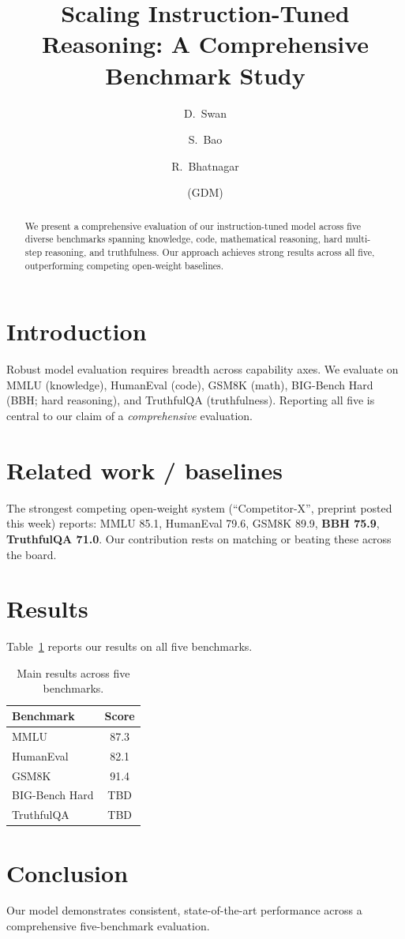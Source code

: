 \documentclass{article}
\title{Scaling Instruction-Tuned Reasoning: A Comprehensive Benchmark Study}
\author{D.\ Swan \and S.\ Bao \and R.\ Bhatnagar \and (GDM)}
\begin{document}
\maketitle

\begin{abstract}
We present a comprehensive evaluation of our instruction-tuned model
across five diverse benchmarks spanning knowledge, code, mathematical
reasoning, hard multi-step reasoning, and truthfulness. Our approach
achieves strong results across all five, outperforming competing
open-weight baselines. %
\end{abstract}

\section{Introduction}
Robust model evaluation requires breadth across capability axes. We
evaluate on MMLU (knowledge), HumanEval (code), GSM8K (math), BIG-Bench
Hard (BBH; hard reasoning), and TruthfulQA (truthfulness). Reporting all
five is central to our claim of a \emph{comprehensive} evaluation.

\section{Related work / baselines}
The strongest competing open-weight system (``Competitor-X'', preprint
posted this week) reports: MMLU 85.1, HumanEval 79.6, GSM8K 89.9,
\textbf{BBH 75.9}, \textbf{TruthfulQA 71.0}. Our contribution rests on
matching or beating these across the board.

\section{Results}
Table~\ref{tab:main} reports our results on all five benchmarks.

\begin{table}[h]
\centering
\caption{Main results across five benchmarks.}
\label{tab:main}
\begin{tabular}{lc}
\toprule
Benchmark & Score \\
\midrule
MMLU & 87.3 \\
HumanEval & 82.1 \\
GSM8K & 91.4 \\
BIG-Bench Hard & TBD \\      %
TruthfulQA & TBD \\          %
\bottomrule
\end{tabular}
\end{table}


\section{Conclusion}
Our model demonstrates consistent, state-of-the-art performance across a
comprehensive five-benchmark evaluation.
\end{document}
